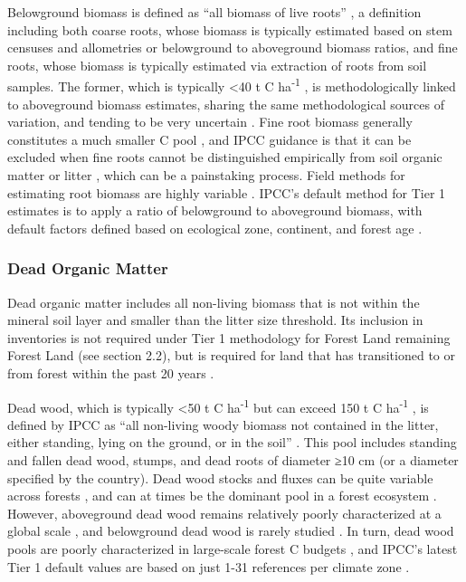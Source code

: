 \documentclass[, manuscript]{copernicus}
\begin{document}
Belowground biomass is defined as ``all biomass of live roots''
\citep{ipcc_good_2003, ipcc_2006_2006}, a definition including both
coarse roots, whose biomass is typically estimated based on stem
censuses and allometries or belowground to aboveground biomass ratios,
and fine roots, whose biomass is typically estimated via extraction of
roots from soil samples. The former, which is typically \textless40 t C
ha\textsuperscript{-1} \citep{anderson-teixeira_carbon_2021}, is
methodologically linked to aboveground biomass estimates, sharing the
same methodological sources of variation, and tending to be very
uncertain \citep[e.g.,][]{keller_biomass_2001}. Fine root biomass
generally constitutes a much smaller C pool \citep[typically \textless5
t C ha\textsuperscript{-1},][]{anderson-teixeira_carbon_2021}, and IPCC
guidance is that it can be excluded when fine roots cannot be
distinguished empirically from soil organic matter or litter
\citep{ipcc_2006_2006}, which can be a painstaking process. Field
methods for estimating root biomass are highly variable
\citep{freschet_starting_2021}. IPCC's default method for Tier 1
estimates is to apply a ratio of belowground to aboveground biomass,
with default factors defined based on ecological zone, continent, and
forest age \citep{ipcc_2006_2006, ipcc_2019_2019}.

\subsubsection{Dead Organic Matter}

Dead organic matter includes all non-living biomass that is not within
the mineral soil layer and smaller than the litter size threshold. Its
inclusion in inventories is not required under Tier 1 methodology for
Forest Land remaining Forest Land (see section 2.2), but is required for
land that has transitioned to or from forest within the past 20 years
\citep{ipcc_2006_2006}.

Dead wood, which is typically \textless50 t C ha\textsuperscript{-1} but
can exceed 150 t C ha\textsuperscript{-1}
\citep{anderson-teixeira_carbon_2021}, is defined by IPCC as ``all
non-living woody biomass not contained in the litter, either standing,
lying on the ground, or in the soil''
\citep{ipcc_good_2003, ipcc_2006_2006}. This pool includes standing and
fallen dead wood, stumps, and dead roots of diameter ≥10 cm (or a
diameter specified by the country). Dead wood stocks and fluxes can be
quite variable across forests \citep{anderson-teixeira_carbon_2021}, and
can at times be the dominant pool in a forest ecosystem \citep[e.g.,
following a severe natural disturbance,][]{carmona_coarse_2002}.
However, aboveground dead wood remains relatively poorly characterized
at a global scale \citep{anderson-teixeira_carbon_2021}, and belowground
dead wood is rarely studied \citep{merganicova_dadwood_2012}. In turn,
dead wood pools are poorly characterized in large-scale forest C budgets
\citep{pan_large_2011, harris_global_2021}, and IPCC's latest Tier 1
default values are based on just 1-31 references per climate zone
\citep[Table 2.2 in][]{ipcc_2019_2019}.
\end{document}
